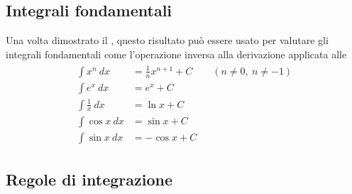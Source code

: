 \documentclass[letterpaper,10pt,english]{jupyterBook}
\begin{document}
\subsection{Integrali fondamentali}
\label{\detokenize{ch/infinitesimal_calculus/integrals:integrali-fondamentali}}\label{\detokenize{ch/infinitesimal_calculus/integrals:infinitesimal-calculus-integrals-fund}}
\sphinxAtStartPar
Una volta dimostrato il {\hyperref[\detokenize{ch/infinitesimal_calculus/integrals:infinitesimal-calculus-integrals-thm-fund}]{}}, questo risultato può essere usato per valutare gli integrali fondamentali come l’operazione inversa alla derivazione applicata alle {\hyperref[\detokenize{ch/infinitesimal_calculus/integrals:infinitesimal-calculus-integrals-fund}]{}}
\begin{equation*}
\begin{split}\begin{aligned}
 \int x^n         \ dx & = \frac{1}{n} x^{n+1} + C  \qquad (n \neq 0, \ n \neq -1) \\ 
 \int e^x         \ dx & = e^x                 + C \\ 
 \int \frac{1}{x} \ dx & = \ln x               + C \\ 
 \int \cos x      \ dx & = \sin x              + C \\ 
 \int \sin x      \ dx & =-\cos x              + C    
\end{aligned}\end{split}
\end{equation*}

\subsection{Regole di integrazione}
\label{\detokenize{ch/infinitesimal_calculus/integrals:regole-di-integrazione}}
\end{document}
